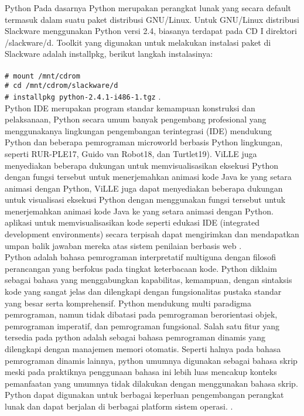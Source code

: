 	Python Pada dasarnya Python merupakan perangkat lunak yang secara default termasuk dalam suatu paket distribusi GNU/Linux. Untuk GNU/Linux distribusi Slackware menggunakan Python versi 2.4, biasanya terdapat pada CD I direktori /slackware/d. Toolkit yang digunakan untuk melakukan instalasi paket di Slackware adalah installpkg, berikut langkah instalasinya:\\ 
  \\ \verb|# mount /mnt/cdrom| 
  \\ \verb|# cd /mnt/cdrom/slackware/d| 
  \\ \verb|# installpkg python-2.4.1-i486-1.tgz| \cite{utamipemrograman}.\\

	Python IDE merupakan program standar kemampuan konstruksi dan pelaksanaan, Python secara umum banyak pengembang profesional yang menggunakanya lingkungan pengembangan terintegrasi (IDE) mendukung Python dan beberapa pemrograman microworld berbasis Python lingkungan, seperti RUR-PLE17, Guido van Robot18, dan Turtlet19). ViLLE juga menyediakan beberapa dukungan untuk memvisualisasikan eksekusi Python dengan fungsi tersebut untuk menerjemahkan animasi kode Java ke yang setara animasi dengan Python, ViLLE  juga dapat menyediakan beberapa dukungan untuk visualisasi eksekusi Python dengan menggunakan fungsi tersebut untuk menerjemahkan animasi kode Java ke yang setara animasi dengan Python. aplikasi untuk memvisualisasikan kode seperti edukasi IDE (integrated development environments) secara terpisah dapat mengirimkan dan mendapatkan umpan balik jawaban mereka atas sistem penilaian berbasis web \cite{helminen2010jype}.\\

	Python adalah bahasa pemrograman interpretatif multiguna dengan filosofi perancangan yang berfokus pada tingkat keterbacaan kode. Python diklaim sebagai bahasa yang menggabungkan kapabilitas, kemampuan, dengan sintaksis kode yang sangat jelas dan dilengkapi dengan fungsionalitas pustaka standar yang besar serta komprehensif. Python mendukung multi paradigma pemrograman, namun tidak dibatasi pada pemrograman berorientasi objek, pemrograman imperatif, dan pemrograman fungsional. Salah satu fitur yang tersedia pada python adalah sebagai bahasa pemrograman dinamis yang dilengkapi dengan manajemen memori otomatis. Seperti halnya pada bahasa pemrograman dinamis lainnya, python umumnya digunakan sebagai bahasa skrip meski pada praktiknya penggunaan bahasa ini lebih luas mencakup konteks pemanfaatan yang umumnya tidak dilakukan dengan menggunakan bahasa skrip. Python dapat digunakan untuk berbagai keperluan pengembangan perangkat lunak dan dapat berjalan di berbagai platform sistem operasi. \cite{rosmalasarana}.\\

